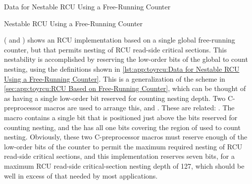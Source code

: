 \begin{listing}[tb]

\caption{Data for Nestable RCU Using a Free-Running Counter}
\label{lst:app:toyrcu:Data for Nestable RCU Using a Free-Running Counter}
\end{listing}

\begin{listing}[tb]
\vspace*{-11pt}
\caption{Nestable RCU Using a Free-Running Counter}
\label{lst:app:toyrcu:Nestable RCU Using a Free-Running Counter}
\end{listing}

( and )
shows an RCU implementation based on a single global free-running counter,
but that permits nesting of RCU read-side critical sections.
This nestability is accomplished by reserving the low-order bits of the
global  to count nesting, using the definitions shown in
\cref{lst:app:toyrcu:Data for Nestable RCU Using a Free-Running Counter}.
This is a generalization of the scheme in
\cref{sec:app:toyrcu:RCU Based on Free-Running Counter},
which can be thought of as having a single low-order bit reserved
for counting nesting depth.
Two C-preprocessor macros are used to arrange this,
 and
.
These are related: .
The  macro contains a single bit that is
positioned just above the bits reserved for counting nesting,
and the  has all one bits covering the
region of  used to count nesting.
Obviously, these two C-preprocessor macros must reserve enough
of the low-order bits of the counter to permit the maximum required
nesting of RCU read-side critical sections, and this implementation
reserves seven bits, for a maximum RCU read-side critical-section
nesting depth of 127, which should be well in excess of that needed
by most applications.

